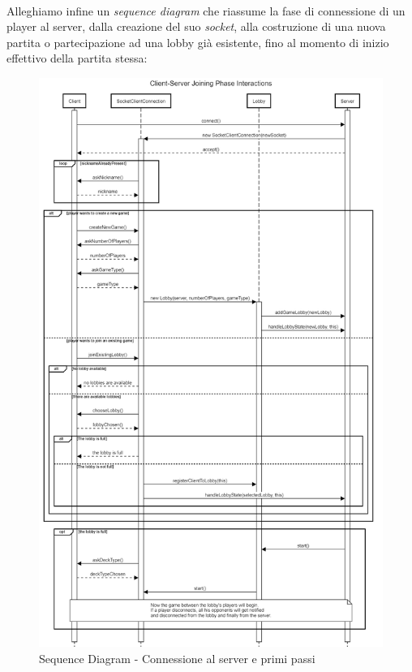 \documentclass[a4paper, 12pt]{article}
\begin{document}
	\paragraph{}
	Alleghiamo infine un \textit{sequence diagram} che riassume la fase di connessione di un player al server, dalla creazione del suo \textit{socket}, alla costruzione di una nuova partita o partecipazione ad una lobby già esistente, fino al momento di inizio effettivo della partita stessa:\\
	\newpage
	\begin{figure}[h!]
		\centering
		\includegraphics[scale=0.33]{SequenceDiagramJoiningPhaseInteractions.png}
		\caption{Sequence Diagram - Connessione al server e primi passi}
	\end{figure}
	
\end{document}
